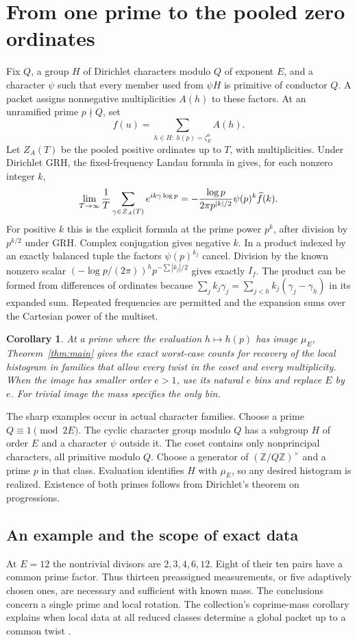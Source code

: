 \documentclass[11pt]{article}
\newtheorem{corollary}[theorem]{Corollary}
\newcommand{\Z}{\mathbb Z}\newcommand{\Q}{\mathbb Q}\newcommand{\D}{\mathcal D}
\begin{document}
\section{From one prime to the pooled zero ordinates}
Fix $Q$, a group $H$ of Dirichlet characters modulo $Q$ of exponent $E$, and a character $\psi$ such that every member used from $\psi H$ is primitive of conductor $Q$. A packet assigns nonnegative multiplicities $A(h)$ to these factors. At an unramified prime $p\nmid Q$, set
\[
 f(u)=\sum_{h\in H:\ h(p)=\zeta_E^u}A(h).
\]
Let $Z_A(T)$ be the pooled positive ordinates up to $T$, with multiplicities. Under Dirichlet GRH, the fixed-frequency Landau formula in \cite{banks,article} gives, for each nonzero integer $k$,
\[
 \lim_{T\to\infty}\frac1T\sum_{\gamma\in Z_A(T)}e^{ik\gamma\log p}
 = -\frac{\log p}{2\pi p^{|k|/2}}\psi(p)^k\widehat f(k).
\]
For positive $k$ this is the explicit formula at the prime power $p^k$, after division by $p^{k/2}$ under GRH. Complex conjugation gives negative $k$. In a product indexed by an exactly balanced tuple the factors $\psi(p)^{k_j}$ cancel. Division by the known nonzero scalar $(-\log p/(2\pi))^h p^{-\sum|k_j|/2}$ gives exactly $I_f$. The product can be formed from differences of ordinates because $\sum_j k_j\gamma_j=\sum_{j<h}k_j(\gamma_j-\gamma_h)$ in its expanded sum. Repeated frequencies are permitted and the expansion sums over the Cartesian power of the multiset.

\begin{corollary}
At a prime where the evaluation $h\mapsto h(p)$ has image $\mu_E$, Theorem~\ref{thm:main} gives the exact worst-case counts for recovery of the local histogram in families that allow every twist in the coset and every multiplicity. When the image has smaller order $e>1$, use its natural $e$ bins and replace $E$ by $e$. For trivial image the mass specifies the only bin.
\end{corollary}
The sharp examples occur in actual character families. Choose a prime $Q\equiv1\pmod{2E}$. The cyclic character group modulo $Q$ has a subgroup $H$ of order $E$ and a character $\psi$ outside it. The coset contains only nonprincipal characters, all primitive modulo $Q$. Choose a generator of $(\Z/Q\Z)^\times$ and a prime $p$ in that class. Evaluation identifies $H$ with $\mu_E$, so any desired histogram is realized. Existence of both primes follows from Dirichlet's theorem on progressions.

\subsection*{An example and the scope of exact data}
At $E=12$ the nontrivial divisors are $2,3,4,6,12$. Eight of their ten pairs have a common prime factor. Thus thirteen preassigned measurements, or five adaptively chosen ones, are necessary and sufficient with known mass. The conclusions concern a single prime and local rotation. The collection's coprime-mass corollary explains when local data at all reduced classes determine a global packet up to a common twist \cite{article}.
\end{document}
